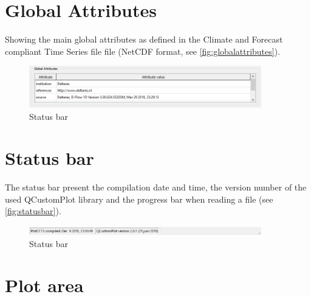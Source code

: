 \documentclass{deltares_memo}
\newcommand{\qcustomplot}{QCustomPlot\xspace}
\newcommand{\netcdf}{NetCDF\xspace}
\begin{document}
\section{Global Attributes}
Showing the main global attributes as defined in the Climate and Forecast compliant Time Series file file (\netcdf format, see \autoref{fig:globalattributes}).
\begin{figure}[H]
    \centering    
    \includegraphics[width=0.9\textwidth]{pictures/group_global_attributes.png}
    \caption{Status bar\label{fig:globalattributes}}
\end{figure}

\section{Status bar}
The status bar present the compilation date and time, the version number of the used \qcustomplot library and the progress bar when reading a file (see \autoref{fig:statusbar}).
\begin{figure}[H]
    \centering    
    \includegraphics[width=0.9\textwidth]{pictures/status_bar.png}
    \caption{Status bar\label{fig:statusbar}}
\end{figure}

\section{Plot area\label{sec:howtohandleplot}}
\end{document}
